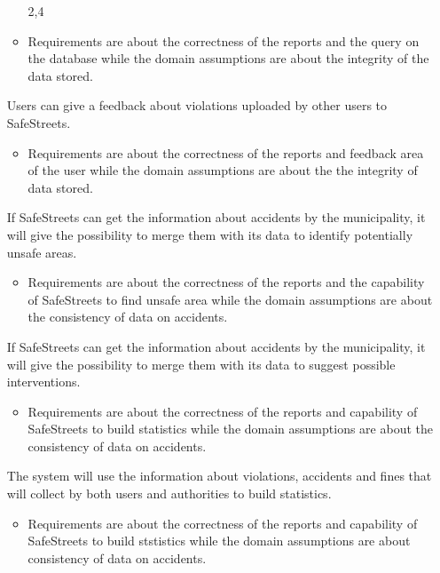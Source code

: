 \documentclass[../RASD.tex]{subfiles}
\begin{document}
\begin{enumerate}
\begin{itemize}
                        \assumption{} 2,4
                        \item Requirements are about the correctness of the reports and the query on the database while the domain assumptions are about the integrity of the data stored.
                    \end{itemize}
                     Users can give a feedback about violations uploaded by other users to SafeStreets.
                    \begin{itemize}
                        \requirement{} 1,2,3,4,5,6,7,8,23,22,24
                        \assumption{} 2,4
                        \item Requirements are about the correctness of the reports and feedback area of the user while the domain assumptions are about the the integrity of data stored.
                    \end{itemize}
                     If SafeStreets can get the information about accidents by the municipality, it will give the possibility to merge them with its data to identify potentially unsafe areas.
                    \begin{itemize}
                        \requirement{} 7,8,13,16,17,18,19,22,29
                        \assumption{} 3,5
                        \item Requirements are about the correctness of the reports and the capability of SafeStreets to find unsafe area while the domain assumptions are about the consistency of data on accidents.
                    \end{itemize}
                     If SafeStreets can get the information about accidents by the municipality, it will give the possibility to merge them with its data to suggest possible interventions.
                    \begin{itemize}
                        \requirement{} 5,6,7,8,17,18,19,20,22,25,29
                        \assumption{} 3,5
                        \item Requirements are about the correctness of the reports and capability of SafeStreets to build statistics while the domain assumptions are about the consistency of data on accidents.
                    \end{itemize}
                    \newpage
                     The system will use the information about violations, accidents and fines that will collect by both users and authorities to build statistics.
                    \begin{itemize}
                        \requirement{} 5,6,7,8,17,18,19,23,24,22,27,29
                        \assumption{} 2,5
                        \item Requirements are about the correctness of the reports and capability of SafeStreets to build ststistics while the domain assumptions are about consistency of data on accidents.
                    \end{itemize}\end{enumerate}
\end{document}
